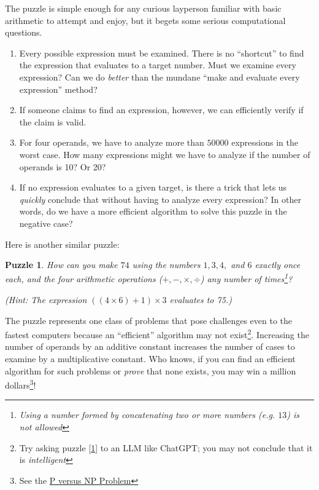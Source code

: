 \documentclass[english,smartquotes]{hgbarticle}
\newtheorem{question}{Puzzle}
\begin{document}
The puzzle is simple enough for any curious layperson familiar with basic arithmetic to attempt and enjoy, but it begets some serious computational questions. 
\begin{enumerate}
\item Every possible expression must be examined. There is no ``shortcut'' to find the expression that evaluates to a target number. Must we examine every expression? Can we do \emph{better} than the mundane ``make and evaluate every expression'' method?

\item If someone claims to find an expression, however, we can efficiently verify if the claim is valid. 

\item For four operands, we have to analyze more than $50000$ expressions in the worst case. How many expressions might we have to analyze if the number of operands is 10? Or 20? 

\item If no expression evaluates to a given target, is there a trick that lets us \emph{quickly} conclude that without having to analyze every expression? In other words, do we have a more efficient algorithm to solve this puzzle in the negative case? 
\end{enumerate}

Here is another similar puzzle:
\begin{question}
\label{puzzle2}
How can you make $74$ using the numbers $1, 3, 4,$ and $6$ exactly once each, and the four arithmetic operations ($+, -, \times, \div$) any number of times\footnote{Using a number formed by concatenating two or more numbers (e.g. $13$) is not allowed}?

({\small Hint: The expression $((4\times6)+1)\times 3$ evaluates to 75.})

\end{question}

The puzzle represents one class of problems that pose challenges even to the fastest computers because an ``efficient'' algorithm may not exist\footnote{Try asking puzzle [\ref{puzzle2}] to an LLM like ChatGPT; you may not conclude that it is \emph{intelligent}}. Increasing the number of operands by an additive constant increases the number of cases to examine by a multiplicative constant. Who knows, if you can find an efficient algorithm for such problems or \emph{prove} that none exists, you may win a million dollars\footnote{See the \href{https://en.wikipedia.org/wiki/P_versus_NP_problem}{P versus NP Problem}}!
\end{document}
